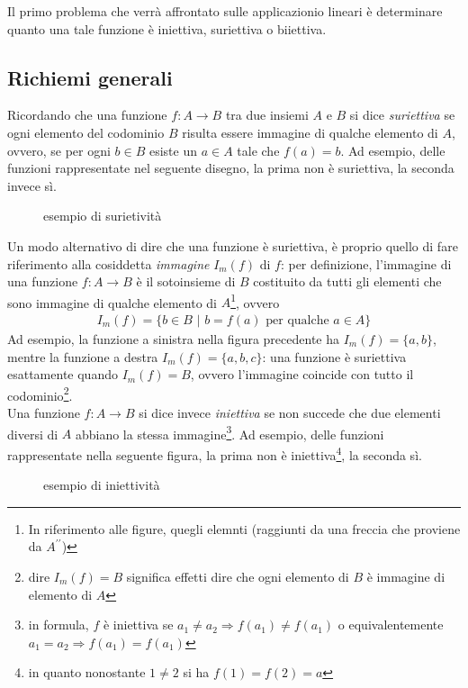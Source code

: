Il primo problema che verrà affrontato sulle applicazionio lineari è determinare quanto
una tale funzione è iniettiva, suriettiva o biiettiva.

\subsection{Richiemi generali}
\label{sec:richgen}

Ricordando che una funzione $f:A\to B$ tra due insiemi $A$ e $B$ si dice \emph{suriettiva}
se ogni elemento del codominio $B$ risulta essere immagine di qualche elemento di $A$,
ovvero, se per ogni $b\in B$ esiste un $a\in A$ tale che $f(a)=b$. Ad esempio, delle
funzioni rappresentate nel seguente disegno, la prima non è suriettiva, la seconda invece sì.
\clearpage
\begin{figure}[ht!]
  \centering
  \resizebox{10cm}{!}{}
  \caption{esempio di surietività}
  \label{fig:ricgendelfab}
\end{figure}
Un modo alternativo di dire che una funzione è suriettiva, è proprio quello di fare riferimento
alla cosiddetta \textit{immagine} $I_m(f)$ di $f$: per definizione, l'immagine di una funzione
$f:A\to B$ è il sotoinsieme di $B$ costituito da tutti gli elementi che sono immagine di qualche
elemento di $A$\footnote{In riferimento alle figure, quegli elemnti (raggiunti da una freccia che
  proviene da $A^{\prime\prime}$)}, ovvero
\begin{eqnarray*}
  I_m(f)=\{b\in B\text{ | }b=f(a) \text{ per qualche } a\in A\}
\end{eqnarray*}
Ad esempio, la funzione a sinistra nella figura precedente ha $I_m(f)=\{a,b\}$, mentre la funzione
a destra $I_m(f)=\{a,b,c\}$: una funzione è suriettiva esattamente quando $I_m(f)=B$, ovvero l'immagine
coincide con tutto il codominio\footnote{dire $I_m(f)=B$ significa effetti dire che ogni elemento di
  $B$ è immagine di elemento di $A$}.\\
Una funzione $f:A\to B$ si dice invece \textit{iniettiva} se non succede che due elementi diversi di $A$
abbiano la stessa immagine\footnote{in formula, $f$ è iniettiva se $a_1\neq a_2\Rightarrow
  f(a_1)\neq f(a_1)$ o equivalentemente $a_1= a_2\Rightarrow f(a_1)= f(a_1)$}. Ad esempio, delle funzioni
rappresentate nella seguente figura, la prima non è iniettiva\footnote{in quanto nonostante $1\neq 2$
  si ha $f(1)=f(2)=a$}, la seconda sì.
\begin{figure}[ht!]
  \centering
  \resizebox{10cm}{!}{}
  \caption{esempio di iniettività}
  \label{fig:ricgendelfab2}
\end{figure}

